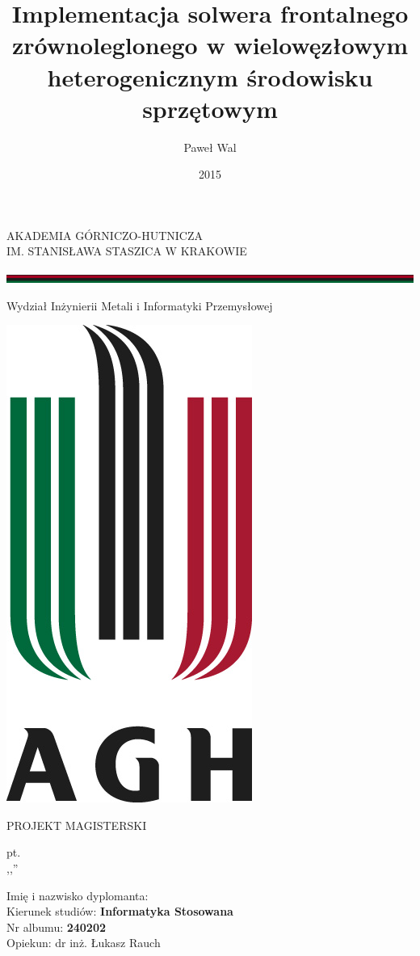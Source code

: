 \documentclass[12pt,a4paper,twoside]{article}
\author{Paweł Wal}
\title{Implementacja solwera frontalnego zrównoleglonego w wielowęzłowym heterogenicznym środowisku sprzętowym}
\date{2015}
\begin{document}
\begin{center}
\Large AKADEMIA GÓRNICZO-HUTNICZA \\ IM. STANISŁAWA STASZICA W KRAKOWIE

\includegraphics[scale=0.58]{agh-pasek}

\large Wydział Inżynierii Metali i Informatyki Przemysłowej

\vspace{33pt}
\noindent \includegraphics[scale=0.5]{logo2}

\vspace{23pt}

\LARGE \noindent PROJEKT MAGISTERSKI

\vspace{23pt}

\Large pt.\\
\Huge \noindent ,,\@title''

\end{center}

\normalsize
\vspace{23pt}
\noindent Imię i nazwisko dyplomanta: \hspace{60pt} \textbf{\@author}\\
Kierunek studiów: \hspace{110.5pt} \textbf{Informatyka Stosowana}\\
Nr albumu:			\hspace{144pt} \textbf{240202}\\
Opiekun: 			\hspace{154pt}	dr inż. Łukasz Rauch
\vspace{13pt}
\end{document}
